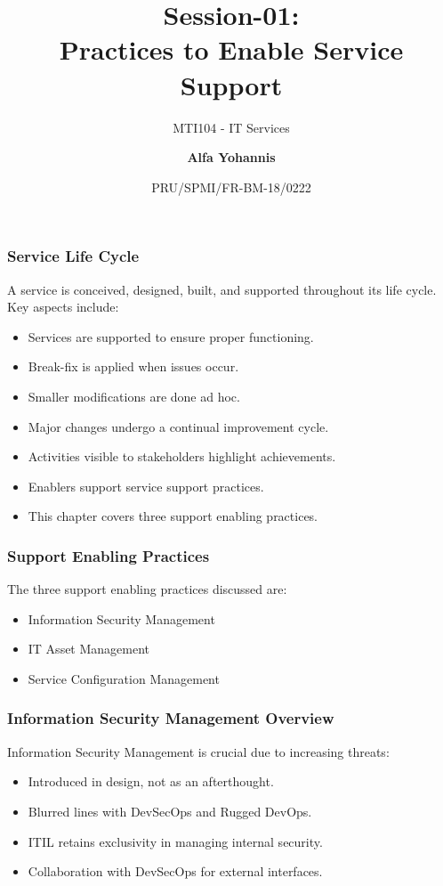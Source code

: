 \documentclass[aspectratio=169, table]{beamer}
\subtitle{MTI104 - IT Services}
\title{Session-01:\\\LARGE{Practices to Enable Service \\Support}}
\date[Serial]{\scriptsize {PRU/SPMI/FR-BM-18/0222}}
\author[Pradita]{\small{\textbf{Alfa Yohannis}}}
\begin{document}
\frame{\titlepage}

\begin{frame}
\frametitle{Service Life Cycle}

A service is conceived, designed, built, and supported throughout its life cycle. Key aspects include:
\begin{itemize}
	\item Services are supported to ensure proper functioning.
	\item Break-fix is applied when issues occur.
	\item Smaller modifications are done ad hoc.
	\item Major changes undergo a continual improvement cycle.
	\item Activities visible to stakeholders highlight achievements.
	\item Enablers support service support practices.
	\item This chapter covers three support enabling practices.
\end{itemize}

\end{frame}

\begin{frame}
\frametitle{Support Enabling Practices}

The three support enabling practices discussed are:
\begin{itemize}
	\item Information Security Management
	\item IT Asset Management
	\item Service Configuration Management
\end{itemize}

\end{frame}

\begin{frame}
\frametitle{Information Security Management Overview}

Information Security Management is crucial due to increasing threats:
\begin{itemize}
	\item Introduced in design, not as an afterthought.
	\item Blurred lines with DevSecOps and Rugged DevOps.
	\item ITIL retains exclusivity in managing internal security.
	\item Collaboration with DevSecOps for external interfaces.
\end{itemize}

\end{frame}
\end{document}
